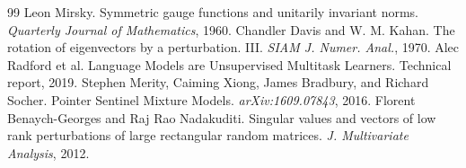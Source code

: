 \documentclass[10pt,twocolumn]{article}
\theoremstyle{definition}
\begin{document}
\begin{thebibliography}{99}
 Leon Mirsky. Symmetric gauge functions and unitarily invariant norms. \emph{Quarterly Journal of Mathematics}, 1960.
 Chandler Davis and W. M. Kahan. The rotation of eigenvectors by a perturbation. III. \emph{SIAM J. Numer. Anal.}, 1970.
 Alec Radford et al. Language Models are Unsupervised Multitask Learners. Technical report, 2019.
 Stephen Merity, Caiming Xiong, James Bradbury, and Richard Socher. Pointer Sentinel Mixture Models. \emph{arXiv:1609.07843}, 2016.
 Florent Benaych-Georges and Raj Rao Nadakuditi. Singular values and vectors of low rank perturbations of large rectangular random matrices. \emph{J. Multivariate Analysis}, 2012.
\end{thebibliography}
\endgroup
\end{document}
